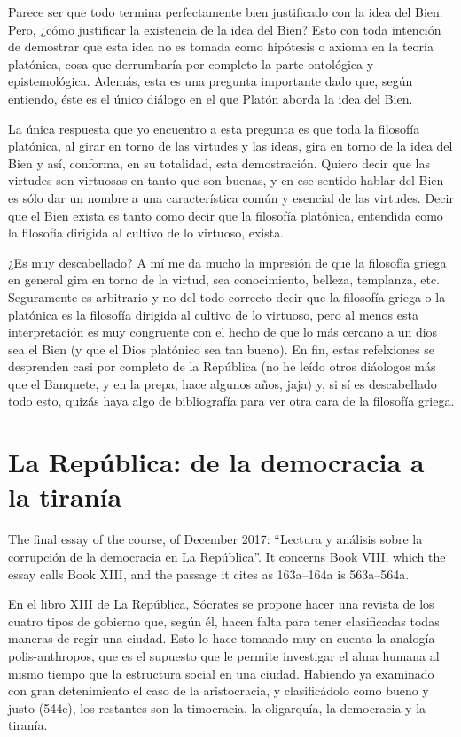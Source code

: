 Parece ser que todo termina perfectamente
bien justificado con la idea del Bien. Pero,
¿cómo justificar la existencia de la idea del
Bien? Esto con toda intención de demostrar
que esta idea no es tomada como hipótesis o
axioma en la teoría platónica, cosa que
derrumbaría por completo la parte ontológica
y epistemológica. Además, esta es una
pregunta importante dado que, según entiendo,
éste es el único diálogo en el que Platón
aborda la idea del Bien.

La única respuesta que yo encuentro a esta
pregunta es que toda la filosofía platónica,
al girar en torno de las virtudes y las
ideas, gira en torno de la idea del Bien y
así, conforma, en su totalidad, esta
demostración. Quiero decir que las virtudes
son virtuosas en tanto que son buenas, y en
ese sentido hablar del Bien es sólo dar un
nombre a una característica común y esencial
de las virtudes. Decir que el Bien exista es
tanto como decir que la filosofía platónica,
entendida como la filosofía dirigida al
cultivo de lo virtuoso, exista.

¿Es muy descabellado? A mí me da mucho la
impresión de que la filosofía griega en
general gira en torno de la virtud, sea
conocimiento, belleza, templanza, etc.
Seguramente es arbitrario y no del todo
correcto decir que la filosofía griega o la
platónica es la filosofía dirigida al cultivo
de lo virtuoso, pero al menos esta
interpretación es muy congruente con el hecho
de que lo más cercano a un dios sea el Bien
(y que el Dios platónico sea tan bueno). En
fin, estas refelxiones se desprenden casi por
completo de la República (no he leído otros
diáologos más que el Banquete, y en la prepa,
hace algunos años, jaja) y, si sí es
descabellado todo esto, quizás haya algo de
bibliografía para ver otra cara de la
filosofía griega.

\section{La República: de la democracia a la
tiranía}
\label{section-republica-democracia}

The final essay of the course, of December
2017: ``Lectura y análisis sobre la
corrupción de la democracia en La
República''. It concerns Book VIII, which
the essay calls Book XIII, and the passage
it cites as 163a--164a is 563a--564a.

En el libro XIII de La República, Sócrates se
propone hacer una revista de los cuatro tipos
de gobierno que, según él, hacen falta para
tener clasificadas todas maneras de regir una
ciudad. Esto lo hace tomando muy en cuenta la
analogía polis-anthropos, que es el supuesto
que le permite investigar el alma humana al
mismo tiempo que la estructura social en una
ciudad. Habiendo ya examinado con gran
detenimiento el caso de la aristocracia, y
clasificádolo como bueno y justo (544e), los
restantes son la timocracia, la oligarquía,
la democracia y la tiranía.

